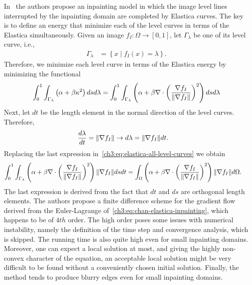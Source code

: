 In~\cite{chan02elasticainpainting} the authors propose an inpainting model in which the image level lines interrupted by the inpainting domain are completed by Elastica curves. The key is to define an energy that minimize each of the level curves in terms of the Elastica simultaneously. Given an image $f_I:\Omega \rightarrow [0,1]$, let $\Gamma_{\lambda}$ be one of its level curve, i.e.,
\begin{align*}
	\Gamma_{\lambda} &= \left\{ x \; | \; f_I(x)=\lambda \right\}.
\end{align*}
%
Therefore, we minimize each level curve in terms of the Elastica energy by minimizing the functional
\begin{align}
	\int_{0}^{1}{ \int_{\Gamma_{\lambda}}{ \left( \alpha + \beta \kappa ^2 \right) dsd\lambda}} = \int_{0}^{1}{ \int_{\Gamma_{\lambda}}{ \left(\alpha + \beta \nabla \cdot \left(\frac{\nabla f_I}{\lVert\nabla f_I\rVert}\right) ^2 \right) dsd\lambda}}
	\label{ch3:eq:elastica-all-level-curves}
\end{align}
%
Next, let $dt$ be the length element in the normal direction of the level curves. Therefore,
\begin{align*}
	\frac{d \lambda}{d t} &= \lVert\nabla f_I\rVert \rightarrow d\lambda = \lVert\nabla f_I\rVert dt.
\end{align*}
%
Replacing the last expression in~\cref{ch3:eq:elastica-all-level-curves} we obtain
\begin{align}
	\int_{0}^{1}{ \int_{\Gamma_{\lambda}}{ \left(\alpha + \beta \nabla \cdot \left(\frac{\nabla f_I}{\lVert\nabla f_I\rVert}\right) ^2 \right)\lVert\nabla f_I\rVert dsdt}} &= \int_{\Omega}{ \left(\alpha + \beta \nabla \cdot \left(\frac{\nabla f_I}{\lVert\nabla f_I\rVert}\right) ^2 \right)\lVert\nabla f_I\rVert d\Omega}.
	\label{ch3:eq:chan-elastica-inpainting}
\end{align}
%
The last expression is derived from the fact that $dt$ and $ds$ are orthogonal length elements. The authors propose a finite difference scheme for the gradient flow derived from the Euler-Lagrange of~\cref{ch3:eq:chan-elastica-inpainting}, which happens to be of $4th$ order. The high order poses some issues with numerical instability, namely the definition of the time step and convergence analysis, which is skipped. The running time is also quite high even for small inpainting domains. Moreover, one can expect a local solution at most, and giving the highly non-convex character of the equation, an acceptable local solution might be very difficult to be found without a conveniently chosen initial solution. Finally, the  method tends to produce blurry edges even for small inpainting domains. 

